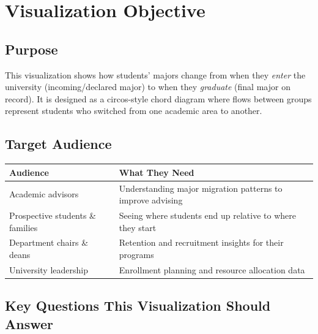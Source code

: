 \documentclass[
  11pt,
  letterpaper,
]{report}
\begin{document}
\newpage

\chapter{Visualization Objective}\label{visualization-objective}

\section{Purpose}\label{purpose}

This visualization shows how students' majors change from when they
\emph{enter} the university (incoming/declared major) to when they
\emph{graduate} (final major on record). It is designed as a
circos-style chord diagram where flows between groups represent students
who switched from one academic area to another.

\section{Target Audience}\label{target-audience}

\begin{longtable}[]{@{}
  >{\raggedright\arraybackslash}p{}
  >{\raggedright\arraybackslash}p{}@{}}
\toprule\noalign{}
\begin{minipage}[b]{\linewidth}\raggedright
Audience
\end{minipage} & \begin{minipage}[b]{\linewidth}\raggedright
What They Need
\end{minipage} \\
\midrule\noalign{}
\endhead
\bottomrule\noalign{}
\endlastfoot
Academic advisors & Understanding major migration patterns to improve
advising \\
Prospective students \& families & Seeing where students end up relative
to where they start \\
Department chairs \& deans & Retention and recruitment insights for
their programs \\
University leadership & Enrollment planning and resource allocation
data \\
\end{longtable}

\section{Key Questions This Visualization Should
Answer}\label{key-questions-this-visualization-should-answer}
\end{document}
